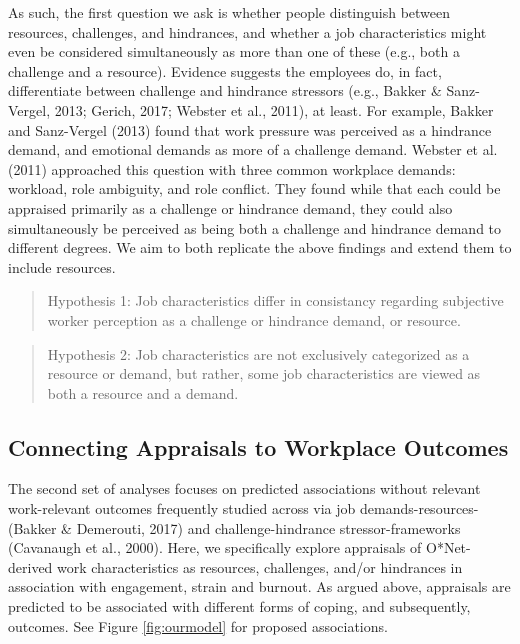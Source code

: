 \documentclass[
  man,mask]{apa7}
\begin{document}
As such, the first question we ask is whether people distinguish between resources, challenges, and hindrances, and whether a job characteristics might even be considered simultaneously as more than one of these (e.g., both a challenge and a resource). Evidence suggests the employees do, in fact, differentiate between challenge and hindrance stressors (e.g., Bakker \& Sanz-Vergel, 2013; Gerich, 2017; Webster et al., 2011), at least. For example, Bakker and Sanz-Vergel (2013) found that work pressure was perceived as a hindrance demand, and emotional demands as more of a challenge demand. Webster et al. (2011) approached this question with three common workplace demands: workload, role ambiguity, and role conflict. They found while that each could be appraised primarily as a challenge or hindrance demand, they could also simultaneously be perceived as being both a challenge and hindrance demand to different degrees. We aim to both replicate the above findings and extend them to include resources.

\begin{quote}
Hypothesis 1: Job characteristics differ in consistancy regarding subjective worker perception as a challenge or hindrance demand, or resource.
\end{quote}

\begin{quote}
Hypothesis 2: Job characteristics are not exclusively categorized as a resource or demand, but rather, some job characteristics are viewed as both a resource and a demand.
\end{quote}

\hypertarget{connecting-appraisals-to-workplace-outcomes}{%
\subsection{Connecting Appraisals to Workplace Outcomes}\label{connecting-appraisals-to-workplace-outcomes}}

The second set of analyses focuses on predicted associations without relevant work-relevant outcomes frequently studied across via job demands-resources- (Bakker \& Demerouti, 2017) and challenge-hindrance stressor-frameworks (Cavanaugh et al., 2000). Here, we specifically explore appraisals of O*Net-derived work characteristics as resources, challenges, and/or hindrances in association with engagement, strain and burnout. As argued above, appraisals are predicted to be associated with different forms of coping, and subsequently, outcomes. See Figure \ref{fig:ourmodel} for proposed associations.
\end{document}
